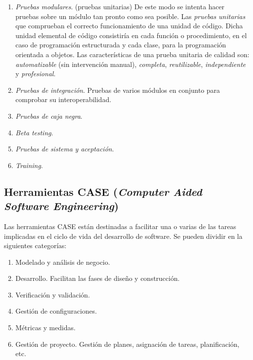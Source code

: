 \begin{enumerate}
\item \emph{Pruebas modulares}. (pruebas unitarias) De este modo se intenta hacer pruebas sobre un módulo tan pronto como sea posible. Las \emph{pruebas unitarias} que comprueban el correcto funcionamiento de una unidad de código. Dicha unidad elemental de código consistiría en cada función o procedimiento, en el caso de programación estructurada y cada clase, para la programación orientada a objetos. Las características de una prueba unitaria de calidad son: \emph{automatizable} (sin intervención manual), \emph{completa},  \emph{reutilizable}, \emph{independiente} y \emph{profesional}.

\item \emph{Pruebas de integración}. Pruebas de varios módulos en conjunto para comprobar su interoperabilidad.

\item \emph{Pruebas de caja negra}.

\item \emph{Beta testing}.

\item \emph{Pruebas de sistema y aceptación}.

\item \emph{Training}.
\end{enumerate}






\subsection{Herramientas CASE (\emph{Computer Aided Software Engineering})}

Las herramientas CASE están destinadas a facilitar una o varias 
de las tareas implicadas en el ciclo de vida del desarrollo de software. Se 
pueden dividir en la siguientes categorías:

\begin{enumerate}
\item Modelado y análisis de negocio.
\item Desarrollo. Facilitan las fases de diseño y construcción.
\item Verificación y validación.
\item Gestión de configuraciones.
\item Métricas y medidas.
\item Gestión de proyecto. Gestión de planes, asignación de tareas, planificación, etc.
\end{enumerate}




